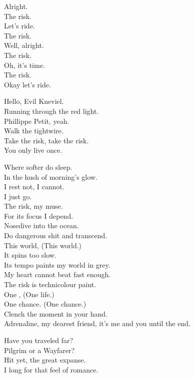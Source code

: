 Alright. \\
The risk. \\
Let's ride. \\
The risk. \\
Well, alright. \\
The risk. \\
Oh, it's time. \\
The risk. \\
Okay let's ride. \\


Hello, Evil Kneviel. \\
Running through the red light. \\
Phillippe Petit, yeah. \\
Walk the tightwire. \\
Take the risk, take the risk. \\
You only live once. \\


Where softer  do sleep. \\
In the hush of morning's glow. \\
I rest not, I cannot. \\
I just go. \\
The risk, my muse. \\
For its focus I depend. \\
Nosedive into the ocean. \\
Do dangerous shit and transcend. \\
This world, (This world.) \\
It spins too slow. \\
Its tempo paints my world in grey. \\
My heart cannot beat fast enough. \\
The risk is technicolour paint. \\
One , (One life.) \\
One chance. (One chance.) \\
Clench the moment in your hand. \\
Adrenaline, my dearest friend, it's me and you until the end. \\



Have you traveled far? \\
Pilgrim or a Wayfarer? \\
Hit yet, the great expanse. \\
I long for that feel of romance. \\

